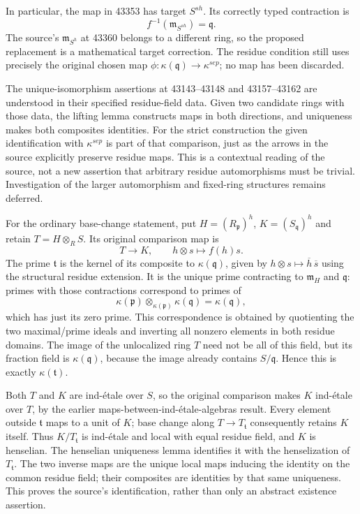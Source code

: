 In particular, the map in 43353 has target \(S^{sh}\). Its correctly typed contraction is \[
 f^{-1}(\mathfrak m_{S^{sh}})=\mathfrak q.
\] The source's \(\mathfrak m_{S^h}\) at 43360 belongs to a different ring, so the proposed replacement is a mathematical target correction. The residue condition still uses precisely the original chosen map \(\phi:\kappa(\mathfrak q)\to\kappa^{sep}\); no map has been discarded.

The unique-isomorphism assertions at 43143--43148 and 43157--43162 are understood in their specified residue-field data. Given two candidate rings with those data, the lifting lemma constructs maps in both directions, and uniqueness makes both composites identities. For the strict construction the given identification with \(\kappa^{sep}\) is part of that comparison, just as the arrows in the source explicitly preserve residue maps. This is a contextual reading of the source, not a new assertion that arbitrary residue automorphisms must be trivial. Investigation of the larger automorphism and fixed-ring structures remains deferred.

For the ordinary base-change statement, put \(H=(R_{\mathfrak p})^h\), \(K=(S_{\mathfrak q})^h\) and retain \(T=H\otimes_R S\). Its original comparison map is \[
 T\longrightarrow K,\qquad h\otimes s\longmapsto f(h)s.
\] The prime \(\mathfrak t\) is the kernel of its composite to \(\kappa(\mathfrak q)\), given by \(h\otimes s\mapsto\overline h\,\overline s\) using the structural residue extension. It is the unique prime contracting to \(\mathfrak m_H\) and \(\mathfrak q\): primes with those contractions correspond to primes of \[
 \kappa(\mathfrak p)\otimes_{\kappa(\mathfrak p)}\kappa(\mathfrak q)
 =\kappa(\mathfrak q),
\] which has just its zero prime. This correspondence is obtained by quotienting the two maximal/prime ideals and inverting all nonzero elements in both residue domains. The image of the unlocalized ring \(T\) need not be all of this field, but its fraction field is \(\kappa(\mathfrak q)\), because the image already contains \(S/\mathfrak q\). Hence this is exactly \(\kappa(\mathfrak t)\).

Both \(T\) and \(K\) are ind-étale over \(S\), so the original comparison makes \(K\) ind-étale over \(T\), by the earlier maps-between-ind-étale-algebras result. Every element outside \(\mathfrak t\) maps to a unit of \(K\); base change along \(T\to T_{\mathfrak t}\) consequently retains \(K\) itself. Thus \(K/T_{\mathfrak t}\) is ind-étale and local with equal residue field, and \(K\) is henselian. The henselian uniqueness lemma identifies it with the henselization of \(T_{\mathfrak t}\). The two inverse maps are the unique local maps inducing the identity on the common residue field; their composites are identities by that same uniqueness. This proves the source's identification, rather than only an abstract existence assertion.

